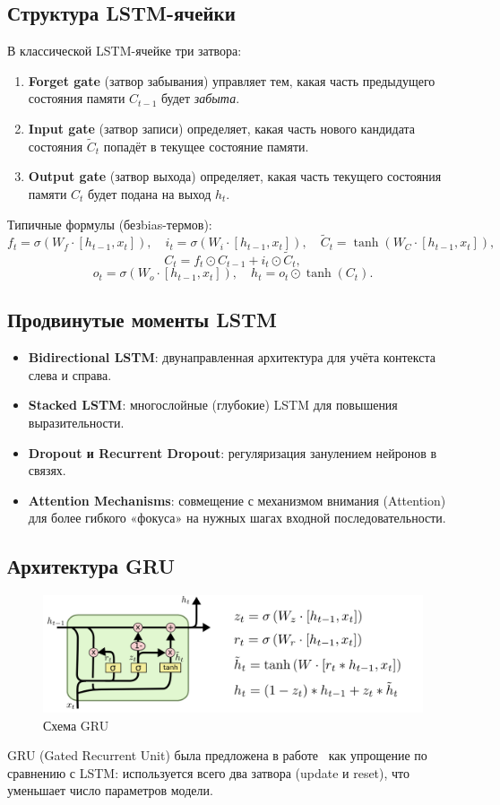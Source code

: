 \subsection{Структура LSTM-ячейки}
В классической LSTM-ячейке три затвора:
\begin{enumerate}
    \item \textbf{Forget gate} (затвор забывания) управляет тем, какая часть предыдущего состояния памяти $C_{t-1}$ будет \textit{забыта}.
    \item \textbf{Input gate} (затвор записи) определяет, какая часть нового кандидата состояния $\tilde{C}_t$ попадёт в текущее состояние памяти.
    \item \textbf{Output gate} (затвор выхода) определяет, какая часть текущего состояния памяти $C_t$ будет подана на выход $h_t$.
\end{enumerate}

Типичные формулы (безbias-термов):
\[
f_t = \sigma(W_f \cdot [h_{t-1}, x_t]), \quad
i_t = \sigma(W_i \cdot [h_{t-1}, x_t]), \quad
\tilde{C}_t = \tanh(W_C \cdot [h_{t-1}, x_t]),
\]
\[
C_t = f_t \odot C_{t-1} + i_t \odot \tilde{C}_t,
\]
\[
o_t = \sigma(W_o \cdot [h_{t-1}, x_t]), \quad
h_t = o_t \odot \tanh(C_t).
\]

\subsection{Продвинутые моменты LSTM}
\begin{itemize}
    \item \textbf{Bidirectional LSTM}: двунаправленная архитектура для учёта контекста слева и справа.
    \item \textbf{Stacked LSTM}: многослойные (глубокие) LSTM для повышения выразительности.
    \item \textbf{Dropout и Recurrent Dropout}: регуляризация занулением нейронов в связях.
    \item \textbf{Attention Mechanisms}: совмещение с механизмом внимания (Attention) для более гибкого «фокуса» на нужных шагах входной последовательности.
\end{itemize}

\subsection{Архитектура GRU}

\begin{figure}[h]
	\centering
	\includegraphics[width=0.6\linewidth]{chapters/neural/images/gru.png}
	\caption{Схема GRU}
	\label{img:gru}
\end{figure}
GRU (Gated Recurrent Unit) была предложена в работе~\cite{cho2014properties} как упрощение по сравнению с LSTM: используется всего два затвора (update и reset), что уменьшает число параметров модели.

